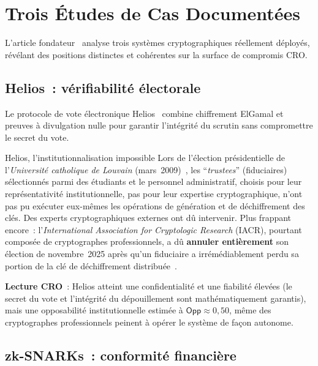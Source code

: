\section{Trois Études de Cas Documentées}
\label{sec:etudes-cas}

L'article fondateur~\cite{minka2026clo} analyse trois systèmes
cryptographiques réellement déployés, révélant des positions
distinctes et cohérentes sur la surface de compromis CRO.

\subsection{Helios~: vérifiabilité électorale}

Le protocole de vote électronique Helios~\cite{adida2009helios}
combine chiffrement ElGamal et preuves à divulgation nulle pour
garantir l'intégrité du scrutin sans compromettre le secret du vote.

\begin{boxscenario}{Helios, l'institutionnalisation impossible}
Lors de l'élection présidentielle de l'\textit{Université catholique
de Louvain} (mars~2009)~\cite{adida2009university}, les
``\textit{trustees}'' (fiduciaires) sélectionnés parmi des étudiants
et le personnel administratif, choisis pour leur représentativité
institutionnelle, pas pour leur expertise cryptographique,
n'ont pas pu exécuter eux-mêmes les opérations de génération et de
déchiffrement des clés. Des experts cryptographiques externes ont
dû intervenir. Plus frappant encore~: l'\textit{International
Association for Cryptologic Research} (IACR), pourtant composée
de cryptographes professionnels, a dû \textbf{annuler entièrement}
son élection de novembre~2025 après qu'un fiduciaire a
irrémédiablement perdu sa portion de la clé de déchiffrement
distribuée~\cite{iacr2025}.
\end{boxscenario}

\textbf{Lecture CRO}~: Helios atteint une confidentialité et une
fiabilité élevées (le secret du vote et l'intégrité du dépouillement
sont mathématiquement garantis), mais une opposabilité
institutionnelle estimée à $\mathsf{Opp} \approx 0{,}50$, même
des cryptographes professionnels peinent à opérer le système de
façon autonome.

\subsection{zk-SNARKs~: conformité financière}

